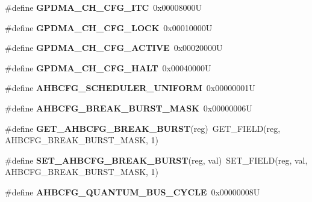 \begin{DoxyCompactItemize}
\#define {\bfseries G\+P\+D\+M\+A\+\_\+\+C\+H\+\_\+\+C\+F\+G\+\_\+\+I\+TC}~0x00008000U
\item 
\mbox{\label{group__lpc24xx__regs_ga33924e2ed8ef6c6aaba2862ade5e61f5}} 
\#define {\bfseries G\+P\+D\+M\+A\+\_\+\+C\+H\+\_\+\+C\+F\+G\+\_\+\+L\+O\+CK}~0x00010000U
\item 
\mbox{\label{group__lpc24xx__regs_ga5cee08ab2ae80ae5e97d5d7dd18508b0}} 
\#define {\bfseries G\+P\+D\+M\+A\+\_\+\+C\+H\+\_\+\+C\+F\+G\+\_\+\+A\+C\+T\+I\+VE}~0x00020000U
\item 
\mbox{\label{group__lpc24xx__regs_gac01cd415a66362c05485038829ef4903}} 
\#define {\bfseries G\+P\+D\+M\+A\+\_\+\+C\+H\+\_\+\+C\+F\+G\+\_\+\+H\+A\+LT}~0x00040000U
\item 
\mbox{\label{group__lpc24xx__regs_ga95f46626c901b2dede1f4e393520d559}} 
\#define {\bfseries A\+H\+B\+C\+F\+G\+\_\+\+S\+C\+H\+E\+D\+U\+L\+E\+R\+\_\+\+U\+N\+I\+F\+O\+RM}~0x00000001U
\item 
\mbox{\label{group__lpc24xx__regs_ga5c3165cab3e1efc9d0e3063179fc5442}} 
\#define {\bfseries A\+H\+B\+C\+F\+G\+\_\+\+B\+R\+E\+A\+K\+\_\+\+B\+U\+R\+S\+T\+\_\+\+M\+A\+SK}~0x00000006U
\item 
\mbox{\label{group__lpc24xx__regs_ga833683cba1616ea7f008b5b1e97a128b}} 
\#define {\bfseries G\+E\+T\+\_\+\+A\+H\+B\+C\+F\+G\+\_\+\+B\+R\+E\+A\+K\+\_\+\+B\+U\+R\+ST}(reg)~G\+E\+T\+\_\+\+F\+I\+E\+LD(reg, A\+H\+B\+C\+F\+G\+\_\+\+B\+R\+E\+A\+K\+\_\+\+B\+U\+R\+S\+T\+\_\+\+M\+A\+SK, 1)
\item 
\mbox{\label{group__lpc24xx__regs_gab2cc37b75e890eb7f5fa64a2aa51a746}} 
\#define {\bfseries S\+E\+T\+\_\+\+A\+H\+B\+C\+F\+G\+\_\+\+B\+R\+E\+A\+K\+\_\+\+B\+U\+R\+ST}(reg,  val)~S\+E\+T\+\_\+\+F\+I\+E\+LD(reg, val, A\+H\+B\+C\+F\+G\+\_\+\+B\+R\+E\+A\+K\+\_\+\+B\+U\+R\+S\+T\+\_\+\+M\+A\+SK, 1)
\item 
\mbox{\label{group__lpc24xx__regs_gaa84c5e7a9459564144c57f18b343f538}} 
\#define {\bfseries A\+H\+B\+C\+F\+G\+\_\+\+Q\+U\+A\+N\+T\+U\+M\+\_\+\+B\+U\+S\+\_\+\+C\+Y\+C\+LE}~0x00000008U

\end{DoxyCompactItemize}
